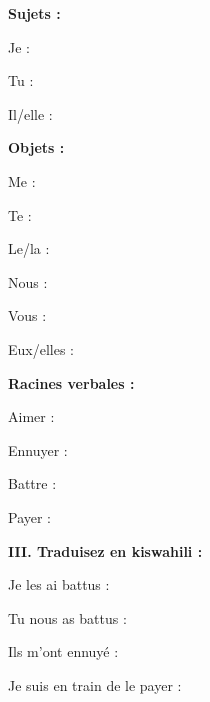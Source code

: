 \begin{keybox}
\textbf{Sujets :}

Je : \dotfill\hspace*{.55\linewidth}\mbox{}

Tu : \dotfill\hspace*{.55\linewidth}\mbox{}

Il/elle : \dotfill\hspace*{.55\linewidth}\mbox{}

\textbf{Objets :}

Me : \dotfill\hspace*{.55\linewidth}\mbox{}

Te : \dotfill\hspace*{.55\linewidth}\mbox{}

Le/la : \dotfill\hspace*{.55\linewidth}\mbox{}

Nous : \dotfill\hspace*{.55\linewidth}\mbox{}

Vous : \dotfill\hspace*{.55\linewidth}\mbox{}

Eux/elles : \dotfill\hspace*{.55\linewidth}\mbox{}

\textbf{Racines verbales :}

Aimer : \dotfill\hspace*{.55\linewidth}\mbox{}

Ennuyer : \dotfill\hspace*{.55\linewidth}\mbox{}
\end{keybox}
\begin{keybox}
Battre : \dotfill\hspace*{.55\linewidth}\mbox{}

Payer : \dotfill\hspace*{.55\linewidth}\mbox{}
\end{keybox}

\noindent\textbf{III. Traduisez en kiswahili :}
\begin{keybox}
Je les ai battus : \dotfill\hspace*{.35\linewidth}\mbox{}

Tu nous as battus : \dotfill\hspace*{.35\linewidth}\mbox{}

Ils m’ont ennuyé : \dotfill\hspace*{.35\linewidth}\mbox{}

Je suis en train de le payer : \dotfill\hspace*{.35\linewidth}\mbox{}
\end{keybox}

